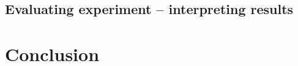 \documentclass[a4paper,12pt]{article}
\begin{document}
	\subsection{Evaluating experiment -- interpreting results}
	
	\section{Conclusion}
	
			
	\newpage
	


	\nocite{*}
%
%
\end{document}
